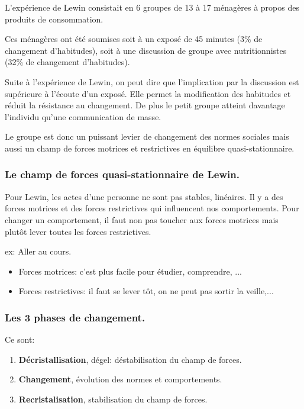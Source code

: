 \documentclass[12pt]{article}
\begin{document}
	L'expérience de Lewin consistait en 6 groupes de 13 à 17 ménagères à propos des produits de consommation. \newline
	
	Ces ménagères ont été soumises soit à un exposé de 45 minutes (3\% de changement d'habitudes), soit à une discussion de groupe avec nutritionnistes (32\% de changement d'habitudes). \newline
	
	Suite à l'expérience de Lewin, on  peut  dire  que l'implication  par  la  discussion  est  supérieure  à l'écoute  d'un  exposé.  Elle  permet  la  modification  des  habitudes  et  réduit  la  résistance  au changement. De plus le petit groupe atteint davantage l'individu qu'une communication de masse. \newline
	
	Le groupe est donc un puissant levier de changement des normes sociales mais aussi un champ de forces motrices et restrictives en équilibre quasi-stationnaire. \newline
	
	\subsubsection*{Le champ de forces quasi-stationnaire de Lewin.}
	
	
	Pour Lewin, les actes d'une personne ne sont pas stables, linéaires. Il y a des forces motrices et des forces restrictives qui influencent nos comportements. Pour changer un comportement, il faut non pas toucher aux forces motrices mais plutôt lever toutes les forces restrictives.
	
	ex: Aller au cours.
	\begin{itemize}
	\item Forces motrices: c'est plus facile pour étudier, comprendre, ...
	\item Forces restrictives: il faut se lever tôt, on ne peut pas sortir la veille,... 
	\end{itemize}
	
	\subsubsection*{Les 3 phases de changement.}
	Ce sont:
	\begin{enumerate}
	\item \textbf{Décristallisation}, dégel: déstabilisation du champ de forces.
	\item \textbf{Changement}, évolution des normes et comportements.
	\item \textbf{Recristalisation}, stabilisation du champ de forces.
	\end{enumerate}
	
\end{document}
